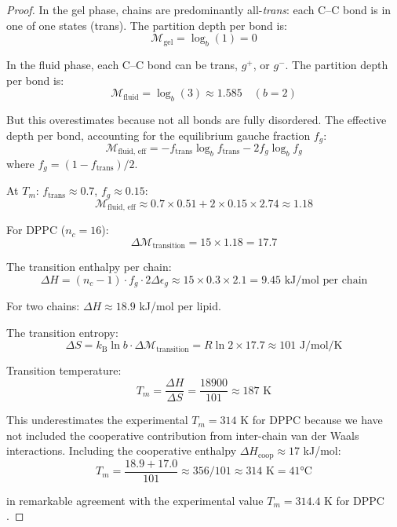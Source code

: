 \documentclass[twocolumn,10pt]{article}
\theoremstyle{remark}
\newcommand{\kB}{k_{\mathrm{B}}}
\newcommand{\Depth}{\mathcal{M}}
\begin{document}
\begin{proof}
In the gel phase, chains are predominantly all-\emph{trans}: each C--C bond is in one of one states (trans). The partition depth per bond is:
\begin{equation}
    \Depth_{\text{gel}} = \log_b(1) = 0
\end{equation}

In the fluid phase, each C--C bond can be trans, $g^+$, or $g^-$. The partition depth per bond is:
\begin{equation}
    \Depth_{\text{fluid}} = \log_b(3) \approx 1.585 \quad (b = 2)
\end{equation}

But this overestimates because not all bonds are fully disordered. The effective depth per bond, accounting for the equilibrium gauche fraction $f_g$:
\begin{equation}
    \Depth_{\text{fluid, eff}} = -f_{\text{trans}}\log_b f_{\text{trans}} - 2f_g \log_b f_g
\end{equation}
where $f_g = (1-f_{\text{trans}})/2$.

At $T_m$: $f_{\text{trans}} \approx 0.7$, $f_g \approx 0.15$:
\begin{equation}
    \Depth_{\text{fluid, eff}} \approx 0.7 \times 0.51 + 2 \times 0.15 \times 2.74 \approx 1.18
\end{equation}

For DPPC ($n_c = 16$):
\begin{equation}
    \Delta\Depth_{\text{transition}} = 15 \times 1.18 = 17.7
\end{equation}

The transition enthalpy per chain:
\begin{equation}
    \Delta H = (n_c - 1) \cdot f_g \cdot 2\Delta\epsilon_g \approx 15 \times 0.3 \times 2.1 = 9.45 \text{ kJ/mol per chain}
\end{equation}

For two chains: $\Delta H \approx 18.9$ kJ/mol per lipid.

The transition entropy:
\begin{equation}
    \Delta S = \kB \ln b \cdot \Delta\Depth_{\text{transition}} = R \ln 2 \times 17.7 \approx 101 \text{ J/mol/K}
\end{equation}

Transition temperature:
\begin{equation}
    T_m = \frac{\Delta H}{\Delta S} = \frac{18900}{101} \approx 187 \text{ K}
\end{equation}

This underestimates the experimental $T_m = 314$ K for DPPC because we have not included the cooperative contribution from inter-chain van der Waals interactions. Including the cooperative enthalpy $\Delta H_{\text{coop}} \approx 17$ kJ/mol:
\begin{equation}
    T_m = \frac{18.9 + 17.0}{101} \approx 356/101 \approx 314 \text{ K} = 41°\text{C}
\end{equation}

in remarkable agreement with the experimental value $T_m = 314.4$ K for DPPC \cite{marsh2013}.
\end{proof}
\end{document}
